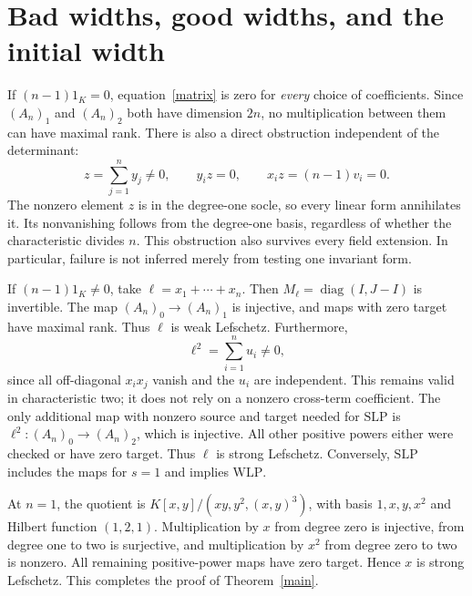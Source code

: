 \documentclass[11pt]{article}
\theoremstyle{definition}
\newcommand{\WLP}{\mathrm{WLP}}
\newcommand{\SLP}{\mathrm{SLP}}
\begin{document}
\section{Bad widths, good widths, and the initial width}
If $(n-1)1_K=0$, equation~\eqref{matrix} is zero for \emph{every}
choice of coefficients. Since $(A_n)_1$ and $(A_n)_2$ both have dimension
$2n$, no multiplication between them can have maximal rank.
There is also a direct obstruction independent of the determinant:
\[
 z=\sum_{j=1}^n y_j\ne0,\qquad
 y_i z=0,\qquad x_i z=(n-1)v_i=0.
\]
The nonzero element $z$ is in the degree-one socle, so every linear form
annihilates it. Its nonvanishing follows from the degree-one basis,
regardless of whether the characteristic divides $n$. This obstruction
also survives every field extension. In particular, failure is not inferred
merely from testing one invariant form.

If $(n-1)1_K\ne0$, take $\ell=x_1+\cdots+x_n$.
Then $M_\ell=\operatorname{diag}(I,J-I)$ is invertible.
The map $(A_n)_0\to(A_n)_1$ is injective, and maps with zero target
have maximal rank. Thus $\ell$ is weak Lefschetz.
Furthermore,
\[
 \ell^2=\sum_{i=1}^n u_i\ne0,
\]
since all off-diagonal $x_ix_j$ vanish and the $u_i$ are independent.
This remains valid in characteristic two; it does not rely on a
nonzero cross-term coefficient. The only additional map with nonzero
source and target needed for $\SLP$ is
$\ell^2:(A_n)_0\to(A_n)_2$, which is injective.
All other positive powers either were checked or have zero target.
Thus $\ell$ is strong Lefschetz. Conversely, $\SLP$ includes the
maps for $s=1$ and implies $\WLP$.

At $n=1$, the quotient is
$K[x,y]/(xy,y^2,(x,y)^3)$, with basis $1,x,y,x^2$ and Hilbert
function $(1,2,1)$. Multiplication by $x$ from degree zero is injective,
from degree one to two is surjective, and multiplication by $x^2$
from degree zero to two is nonzero. All remaining positive-power maps
have zero target. Hence $x$ is strong Lefschetz. This completes the
proof of Theorem~\ref{main}.
\end{document}
